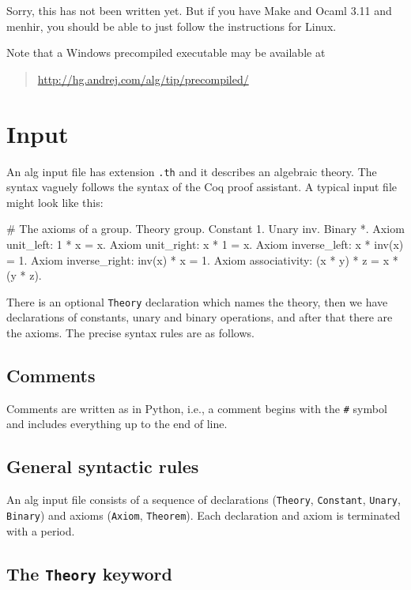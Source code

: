 \documentclass{report}
\begin{document}
Sorry, this has not been written yet. But if you have Make and Ocaml
3.11 and menhir, you should be able to just follow the instructions
for Linux.

Note that a Windows precompiled executable may be available at
%
\begin{quote}
  \url{http://hg.andrej.com/alg/tip/precompiled/}
\end{quote}

\chapter{Input}
\label{sec:input}

An alg input file has extension \texttt{.th} and it describes an
algebraic theory. The syntax vaguely follows the syntax of the Coq
proof assistant. A typical input file might look like this:
%
\begin{alg}
# The axioms of a group.
Theory group.
Constant 1.
Unary inv.
Binary *.
Axiom unit_left: 1 * x = x.
Axiom unit_right: x * 1 = x.
Axiom inverse_left: x * inv(x) = 1.
Axiom inverse_right: inv(x) * x = 1.
Axiom associativity: (x * y) * z = x * (y * z).
\end{alg}
%
There is an optional \texttt{Theory} declaration which names the
theory, then we have declarations of constants, unary and binary
operations, and after that there are the axioms. The precise
syntax rules are as follows.

\section{Comments}

Comments are written as in Python, i.e., a comment begins with the
\texttt{\#} symbol and includes everything up to the end of line.

\section{General syntactic rules}

An alg input file consists of a sequence of declarations
(\texttt{Theory}, \texttt{Constant}, \texttt{Unary}, \texttt{Binary})
and axioms (\texttt{Axiom}, \texttt{Theorem}). Each declaration and
axiom is terminated with a period.

\section{The \texttt{Theory} keyword}
\end{document}
